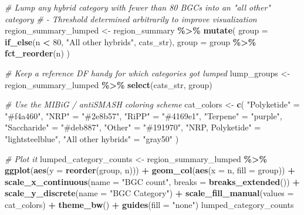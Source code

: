 \documentclass[
]{article}
\newenvironment{Shaded}{\begin{snugshade}}{\end{snugshade}}
\newcommand{\AttributeTok}[1]{\textcolor[rgb]{0.13,0.29,0.53}{#1}}
\newcommand{\CommentTok}[1]{\textcolor[rgb]{0.56,0.35,0.01}{\textit{#1}}}
\newcommand{\DecValTok}[1]{\textcolor[rgb]{0.00,0.00,0.81}{#1}}
\newcommand{\FunctionTok}[1]{\textcolor[rgb]{0.13,0.29,0.53}{\textbf{#1}}}
\newcommand{\NormalTok}[1]{#1}
\newcommand{\OtherTok}[1]{\textcolor[rgb]{0.56,0.35,0.01}{#1}}
\newcommand{\SpecialCharTok}[1]{\textcolor[rgb]{0.81,0.36,0.00}{\textbf{#1}}}
\newcommand{\StringTok}[1]{\textcolor[rgb]{0.31,0.60,0.02}{#1}}
\begin{document}
\begin{Shaded}
\begin{Highlighting}[]
\CommentTok{\# Lump any hybrid category with fewer than 80 BGCs into an "all other" category}
\CommentTok{\# {-} Threshold determined arbitrarily to improve visualization}
\NormalTok{region\_summary\_lumped }\OtherTok{\textless{}{-}}\NormalTok{ region\_summary }\SpecialCharTok{\%\textgreater{}\%}
  \FunctionTok{mutate}\NormalTok{(}
    \AttributeTok{group =} \FunctionTok{if\_else}\NormalTok{(n }\SpecialCharTok{\textless{}} \DecValTok{80}\NormalTok{, }\StringTok{"All other hybrids"}\NormalTok{, cats\_str),}
    \AttributeTok{group =}\NormalTok{ group }\SpecialCharTok{\%\textgreater{}\%} \FunctionTok{fct\_reorder}\NormalTok{(n)}
\NormalTok{  )}

\CommentTok{\# Keep a reference DF handy for which categories got lumped}
\NormalTok{lump\_groups }\OtherTok{\textless{}{-}}\NormalTok{ region\_summary\_lumped }\SpecialCharTok{\%\textgreater{}\%} \FunctionTok{select}\NormalTok{(cats\_str, group)}

\CommentTok{\# Use the MIBiG / antiSMASH coloring scheme}
\NormalTok{cat\_colors }\OtherTok{\textless{}{-}} \FunctionTok{c}\NormalTok{(}
  \StringTok{"Polyketide"} \OtherTok{=} \StringTok{"\#f4a460"}\NormalTok{,}
  \StringTok{"NRP"} \OtherTok{=} \StringTok{"\#2e8b57"}\NormalTok{,}
  \StringTok{"RiPP"} \OtherTok{=} \StringTok{"\#4169e1"}\NormalTok{,}
  \StringTok{"Terpene"} \OtherTok{=} \StringTok{"purple"}\NormalTok{,}
  \StringTok{"Saccharide"} \OtherTok{=} \StringTok{"\#deb887"}\NormalTok{,}
  \StringTok{"Other"} \OtherTok{=} \StringTok{"\#191970"}\NormalTok{,}
  \StringTok{"NRP, Polyketide"} \OtherTok{=} \StringTok{"lightsteelblue"}\NormalTok{,}
  \StringTok{"All other hybrids"} \OtherTok{=} \StringTok{"gray50"}
\NormalTok{)}

\CommentTok{\# Plot it}
\NormalTok{lumped\_category\_counts }\OtherTok{\textless{}{-}}\NormalTok{ region\_summary\_lumped }\SpecialCharTok{\%\textgreater{}\%}
  \FunctionTok{ggplot}\NormalTok{(}\FunctionTok{aes}\NormalTok{(}\AttributeTok{y =} \FunctionTok{reorder}\NormalTok{(group, n))) }\SpecialCharTok{+}
  \FunctionTok{geom\_col}\NormalTok{(}\FunctionTok{aes}\NormalTok{(}\AttributeTok{x =}\NormalTok{ n, }\AttributeTok{fill =}\NormalTok{ group)) }\SpecialCharTok{+}
  \FunctionTok{scale\_x\_continuous}\NormalTok{(}\AttributeTok{name =} \StringTok{"BGC count"}\NormalTok{, }\AttributeTok{breaks =} \FunctionTok{breaks\_extended}\NormalTok{()) }\SpecialCharTok{+}
  \FunctionTok{scale\_y\_discrete}\NormalTok{(}\AttributeTok{name =} \StringTok{"BGC Category"}\NormalTok{) }\SpecialCharTok{+}
  \FunctionTok{scale\_fill\_manual}\NormalTok{(}\AttributeTok{values =}\NormalTok{ cat\_colors) }\SpecialCharTok{+}
  \FunctionTok{theme\_bw}\NormalTok{() }\SpecialCharTok{+}
  \FunctionTok{guides}\NormalTok{(}\AttributeTok{fill =} \StringTok{"none"}\NormalTok{)}
\NormalTok{lumped\_category\_counts}
\end{Highlighting}
\end{Shaded}
\end{document}
